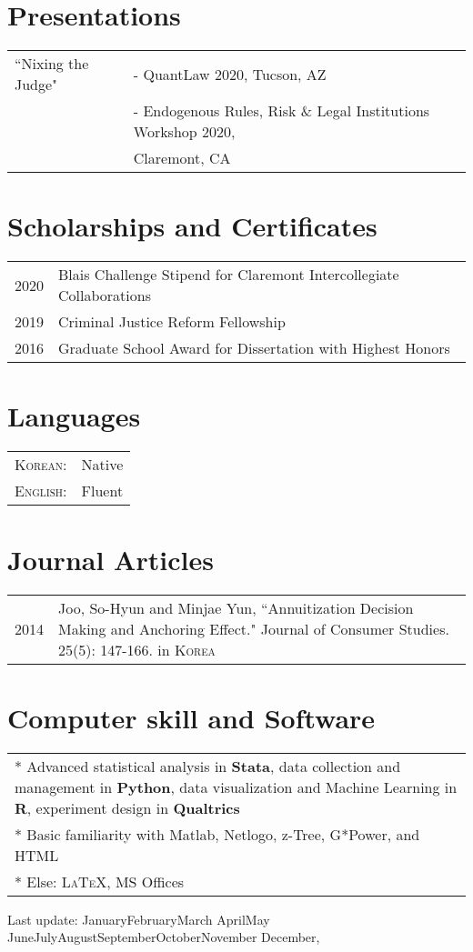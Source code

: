\documentclass[a4paper,10pt]{article}
\newcommand{\mytoday}{\ifcase \month \or January\or February\or March\or %
April\or May \or June\or July\or August\or September\or October\or November\or %
December\fi, \number \year}
\begin{document}
\section{Presentations}
\begin{tabular}{ll}
``Nixing the Judge" & - QuantLaw 2020, Tucson, AZ \\
& - Endogenous Rules, Risk \& Legal Institutions Workshop 2020, \\ & Claremont, CA
\end{tabular}

\section{Scholarships and Certificates}
\begin{tabular}{rl}
2020 & Blais Challenge Stipend for Claremont Intercollegiate Collaborations\\
2019 & Criminal Justice Reform Fellowship\\
2016 & Graduate School Award for Dissertation with Highest Honors\normalsize\end{tabular}

\section{Languages}
\begin{tabular}{rl}
 \textsc{Korean:}&Native\\
\textsc{English:}&Fluent\\
\end{tabular}

\section{Journal Articles}
\begin{tabular}{r|p{11cm}}
 \textsc{2014}&Joo, So-Hyun and Minjae Yun, ``Annuitization Decision Making and Anchoring Effect." Journal of Consumer Studies. 25(5): 147-166. in \textsc{Korea}\\
\end{tabular}

\section{Computer skill and Software}
\begin{tabularx}{\textwidth}{p{}}
* Advanced statistical analysis in \textbf{Stata}, data collection and management in \textbf{Python}, data visualization and Machine Learning in \textbf{R}, experiment design in \textbf{Qualtrics} \\

* Basic familiarity with Matlab, Netlogo, z-Tree, G*Power, and HTML \\ 

* Else: \textsc{LaTeX}\setmainfont[SmallCapsFont=Fontin-SmallCaps.otf]{Fontin.otf}, MS Offices \\
\end{tabularx}



\scriptsize{Last update: \mytoday} %
\end{document}
